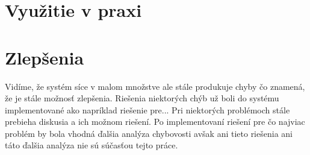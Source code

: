 \section{Využitie v praxi}



\section{Zlepšenia}

Vidíme, že systém síce v malom množstve ale stále produkuje chyby čo znamená, že je stále možnosť zlepšenia. Riešenia niektorých chýb už boli do systému implementované ako napríklad riešenie pre... Pri niektorých problémoch stále prebieha diskusia a ich možnom riešení. Po implementovaní riešení pre čo najviac problém by bola vhodná ďalšia analýza chybovosti avšak ani tieto riešenia ani táto ďalšia analýza nie sú súčasťou tejto práce.
